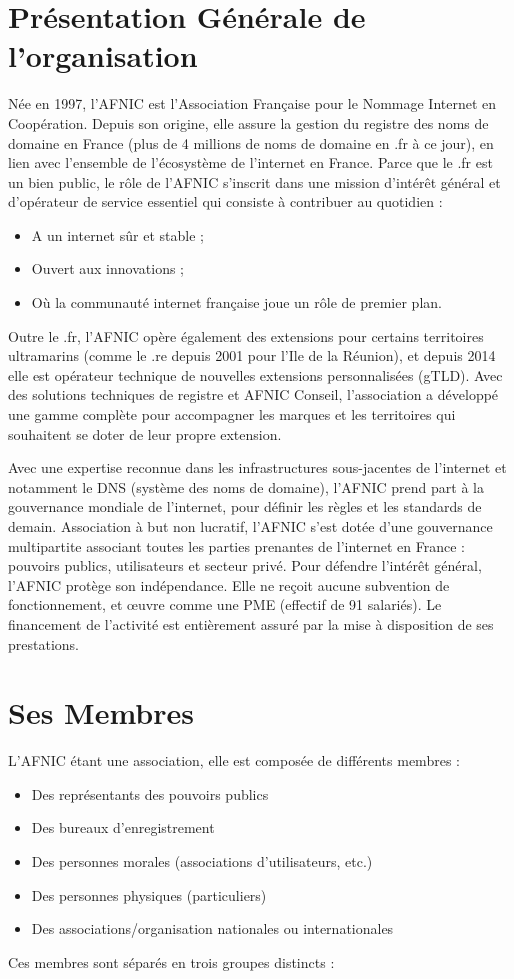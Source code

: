 \setcounter{section}{0}
\section{Présentation Générale de l'organisation}\cite{infoAfnic}
Née en 1997, l’AFNIC est l’Association Française pour le Nommage Internet en Coopération.
Depuis son origine, elle assure la gestion du registre des noms de domaine en France (plus de 4 millions de noms de domaine en .fr à ce jour), en lien avec l’ensemble de l’écosystème de l’internet en France.
Parce que le .fr est un bien public, le rôle de l’AFNIC s’inscrit dans une mission d’intérêt général et d’opérateur de service essentiel qui consiste à contribuer au quotidien :
\begin{itemize}
    \item A un internet sûr et stable ;
    \item Ouvert aux innovations ;
    \item Où la communauté internet française joue un rôle de premier plan.
\end{itemize}

Outre le .fr, l’AFNIC opère également des extensions pour certains territoires ultramarins (comme le .re depuis 2001 pour l’Ile de la Réunion), et depuis 2014 elle est opérateur technique de nouvelles extensions personnalisées (gTLD). Avec des solutions techniques de registre et AFNIC Conseil, l’association a développé une gamme complète pour accompagner les marques et les territoires qui souhaitent se doter de leur propre extension.

Avec une expertise reconnue dans les infrastructures sous-jacentes de l’internet et notamment le DNS (système des noms de domaine), l’AFNIC prend part à la gouvernance mondiale de l’internet, pour définir les règles et les standards de demain.
Association à but non lucratif, l’AFNIC s’est dotée d’une gouvernance multipartite associant toutes les parties prenantes de l’internet en France : pouvoirs publics, utilisateurs et secteur
privé.
Pour défendre l’intérêt général, l’AFNIC protège son indépendance. Elle ne reçoit aucune subvention de fonctionnement, et œuvre comme une PME (effectif de 91 salariés). Le financement de l’activité est entièrement assuré par la mise à disposition de ses prestations.

\section{Ses Membres}
L’AFNIC étant une association, elle est composée de différents membres :
\begin{itemize}
    \item Des représentants des pouvoirs publics
    \item Des bureaux d’enregistrement 
    \item Des personnes morales (associations d’utilisateurs, etc.)
    \item Des personnes physiques (particuliers)
    \item Des associations/organisation nationales ou internationales
\end{itemize}
\vspace{10pt}
Ces membres sont séparés en trois groupes distincts :


